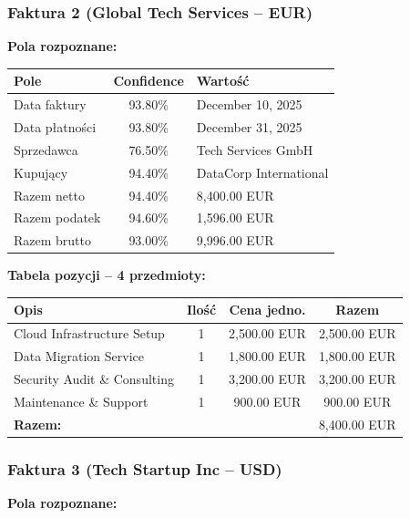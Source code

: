 \subsubsection{Faktura 2 (Global Tech Services – EUR)}

\textbf{Pola rozpoznane:}

\begin{center}
	\begin{tabular}{|l|c|l|}
		\hline
		\textbf{Pole} & \textbf{Confidence} & \textbf{Wartość} \\
		\hline
		Data faktury & 93.80\% & December 10, 2025 \\
		Data płatności & 93.80\% & December 31, 2025 \\
		Sprzedawca & 76.50\% & Tech Services GmbH \\
		Kupujący & 94.40\% & DataCorp International \\
		Razem netto & 94.40\% & 8,400.00 EUR \\
		Razem podatek & 94.60\% & 1,596.00 EUR \\
		Razem brutto & 93.00\% & 9,996.00 EUR \\
		\hline
	\end{tabular}
\end{center}

\textbf{Tabela pozycji – 4 przedmioty:}

\begin{center}
	\begin{tabular}{|l|c|c|c|}
		\hline
		\textbf{Opis} & \textbf{Ilość} & \textbf{Cena jedno.} & \textbf{Razem} \\
		\hline
		Cloud Infrastructure Setup & 1 & 2,500.00 EUR & 2,500.00 EUR \\
		Data Migration Service & 1 & 1,800.00 EUR & 1,800.00 EUR \\
		Security Audit \& Consulting & 1 & 3,200.00 EUR & 3,200.00 EUR \\
		Maintenance \& Support & 1 & 900.00 EUR & 900.00 EUR \\
		\hline
		\multicolumn{3}{|l|}{\textbf{Razem:}} & 8,400.00 EUR \\
		\hline
	\end{tabular}
\end{center}

\subsubsection{Faktura 3 (Tech Startup Inc – USD)}

\textbf{Pola rozpoznane:}

